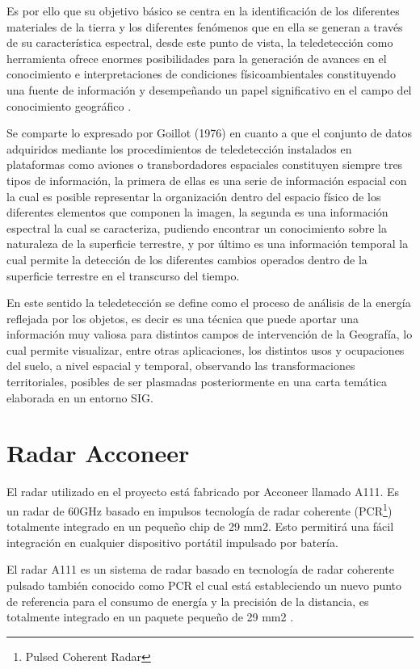 Es por ello que su objetivo básico se centra en la identificación de los diferentes materiales de la tierra y los diferentes fenómenos que en ella se generan a través de su característica espectral, desde este punto de vista, la teledetección como herramienta ofrece enormes posibilidades para la generación de avances en el conocimiento e interpretaciones de condiciones físicoambientales constituyendo una fuente de información y desempeñando un papel significativo en el campo del conocimiento geográfico \cite{Botana2019}. 

Se comparte lo expresado por Goillot (1976) en cuanto a que el conjunto de datos adquiridos mediante los procedimientos de teledetección instalados en plataformas como aviones o transbordadores espaciales constituyen siempre tres tipos de información, la primera de ellas es una serie de información espacial con la cual es posible representar la organización dentro del espacio físico de los diferentes elementos que componen la imagen, la segunda es una información espectral la cual se caracteriza, pudiendo encontrar un conocimiento sobre la naturaleza de la superficie terrestre, y por último es una información temporal la cual permite la detección de los diferentes cambios operados dentro de la superficie terrestre en el transcurso del tiempo. 

En este sentido la teledetección se define como el proceso de análisis de la energía reflejada por los objetos, es decir es una técnica que puede aportar una información muy valiosa para distintos campos de intervención de la Geografía, lo cual permite visualizar, entre otras aplicaciones, los distintos usos y ocupaciones del suelo, a nivel espacial y temporal, observando las transformaciones territoriales, posibles de ser plasmadas posteriormente en una carta temática elaborada en un entorno SIG. 

\section{Radar Acconeer}

El radar utilizado en el proyecto está fabricado por Acconeer llamado A111. Es un radar de 60GHz basado en impulsos tecnología de radar coherente (PCR\footnote{Pulsed
Coherent Radar}) totalmente integrado en un pequeño chip de 29 mm2.
Esto permitirá una fácil integración en cualquier dispositivo portátil impulsado por batería.

El radar A111 es un sistema de radar basado en tecnología de radar coherente pulsado  también conocido como PCR el cual está estableciendo un nuevo punto de referencia para el consumo de energía y la precisión de la distancia, es totalmente integrado en un paquete pequeño de 29 mm2 \cite{Acconeer2021}.

